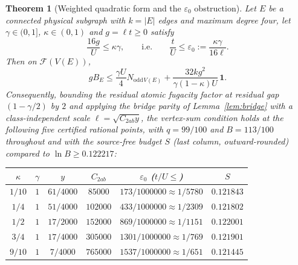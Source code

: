 \documentclass[11pt]{article}
\theoremstyle{plain}
\newtheorem{theorem}{Theorem}
\theoremstyle{definition}
\newcommand{\Nodd}{N_{\mathrm{odd}}}
\begin{document}
\begin{theorem}[Weighted quadratic form and the $\varepsilon_0$
obstruction]\label{thm:weighted}
Let $E$ be a connected physical subgraph with $k=|E|$ edges and maximum degree four,
let $\gamma\in(0,1]$, $\kappa\in(0,1)$ and $g=\ell t\ge0$ satisfy
\begin{equation}\label{eq:kappa}
\frac{16g}{U}\le\kappa\gamma,
\qquad\text{i.e.}\qquad
\frac{t}{U}\le\varepsilon_0:=\frac{\kappa\gamma}{16\ell}.
\end{equation}
Then on $\mathcal{F}(V(E))$,
\begin{equation}\label{eq:twoab}
gB_E\le\frac{\gamma U}{4}\Nodd{}_{V(E)}
+\frac{32kg^{2}}{\gamma(1-\kappa)U}\,\mathbf{1}.
\end{equation}
Consequently, bounding the residual atomic fugacity factor at residual gap
$(1-\gamma/2)$ by $2$ and applying the bridge parity of Lemma~\ref{lem:bridge} with a
class-independent scale $\ell=\sqrt{C_{2ab}y}$, the vertex-sum condition holds at the
following five certified rational points, with $q=99/100$ and $B=113/100$ throughout
and with the source-free budget $S$ (last column, outward-rounded) compared to
$\ln B\ge0.122217$:
\begin{center}
\begin{tabular}{cccccc}
\hline
$\kappa$ & $\gamma$ & $y$ & $C_{2ab}$ & $\varepsilon_0$ ($t/U\le$) & $S$\\
\hline
$1/10$ & $1$ & $61/4000$ & $85000$ & $173/1000000\approx1/5780$ & $0.121843$\\
$1/4$ & $1$ & $51/4000$ & $102000$ & $433/1000000\approx1/2309$ & $0.121802$\\
$1/2$ & $1$ & $17/2000$ & $152000$ & $869/1000000\approx1/1151$ & $0.122001$\\
$3/4$ & $1$ & $17/4000$ & $305000$ & $1301/1000000\approx1/769$ & $0.121901$\\
$9/10$ & $1$ & $7/4000$ & $765000$ & $1537/1000000\approx1/651$ & $0.121445$\\
\hline
\end{tabular}
\end{center}
\end{theorem}
\end{document}
